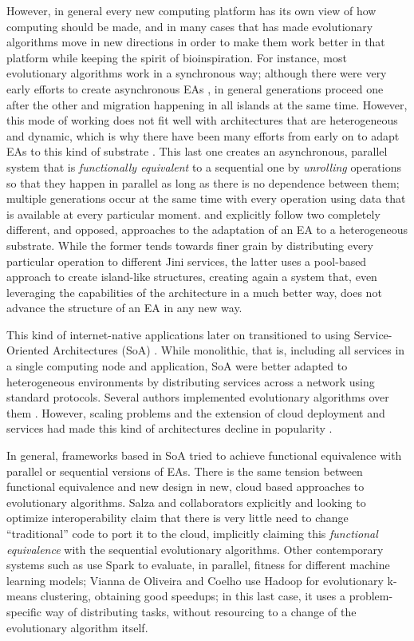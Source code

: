 \documentclass[sigconf]{acmart}
\begin{document}
However, in general every new computing platform has its own view of
how computing should be made, and in many cases that has made
evolutionary algorithms move in new directions in order to make them
work better in that platform while keeping the spirit of
bioinspiration. For instance, most evolutionary algorithms work in a
synchronous way; although there were very early efforts to create
asynchronous EAs \cite{coleman89}, in general
generations proceed one after the other and migration happening in
all islands at the same time. However, this mode of working does not
fit well with architectures that are heterogeneous and dynamic, which
is why there have been many efforts from early
on to adapt EAs to this kind of substrate
\cite{Jini:FEA2000,zorman2002creation,baugh2003asynchronous}. This
last one creates an asynchronous, parallel system that is {\em functionally
  equivalent} to a sequential one by {\em unrolling} operations so
that they happen in parallel as long as there is no dependence between
them; multiple generations occur at the same time with every operation
using data that is available at every particular
moment. \cite{Jini:FEA2000} and \cite{zorman2002creation} explicitly
follow two completely different, and opposed, approaches to the
adaptation of an EA to a heterogeneous substrate. While the former
tends towards finer grain by distributing every particular operation
to different Jini services, the latter uses a pool-based approach to
create island-like structures, creating again a system that, even
leveraging the capabilities of the architecture in a much better way,
does not advance the  structure of an EA in any new way.

This kind of internet-native applications later on transitioned to
using Service-Oriented Architectures (SoA) \cite{Papazoglou2007}. While monolithic, that is,
including all services in a single computing node and application, SoA
were better adapted to heterogeneous environments by distributing
services across a network using standard protocols. Several authors
implemented evolutionary algorithms over them
\cite{garcia2013service,munawar2010design,6955331}. However, scaling
problems and the extension of cloud deployment and services had made
this kind of architectures decline in popularity
\cite{Varghese2018849}.

In general, frameworks based in SoA tried to achieve functional equivalence with parallel
or sequential versions of EAs. There is the same tension between
functional equivalence and new
design in new, cloud based approaches to evolutionary
algorithms. Salza and collaborators \cite{salza2017ccube,de2017parallel} explicitly
and looking to optimize interoperability claim that there is very
little need to change ``traditional'' code to port it to the cloud,
implicitly claiming this {\em functional equivalence} with the
sequential evolutionary algorithms. Other contemporary systems such as
\cite{10.1007/978-3-319-32149-3_46} use Spark to evaluate, in
parallel, fitness for different machine learning models;
Vianna de Oliveira and Coelho \cite{de2015scalable} use Hadoop for evolutionary k-means clustering,
obtaining good speedups; in this last case, it uses a problem-specific
way of distributing tasks, without resourcing to a change of the
evolutionary algorithm itself.
\end{document}
